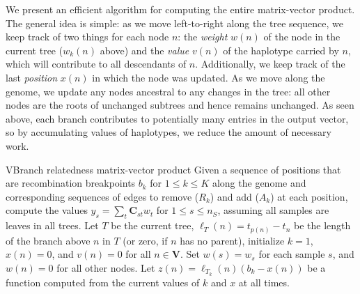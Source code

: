 We present an efficient algorithm for computing the entire matrix-vector product.
The general idea is simple: as we move left-to-right along the tree sequence,
we keep track of two things for each node $n$:
the \textit{weight} $w(n)$ of the node in the current tree ($w_k(n)$ above) and
the \textit{value} $v(n)$ of the haplotype carried by $n$,
which will contribute to all descendants of $n$.
Additionally, we keep track of the last \textit{position} $x(n)$ in which the node was updated.
As we move along the genome, we update any nodes ancestral to any changes in the tree:
all other nodes are the roots of unchanged subtrees and hence remains unchanged.
As seen above, each branch contributes to potentially many entries in the output vector,
so by accumulating values of haplotypes, we reduce the amount of necessary work.


\begin{taocpalg}{V}{Branch relatedness matrix-vector product}
{
    Given a sequence of positions that are recombination breakpoints $b_k$ for $1 \le k \le K$ 
    along the genome and corresponding sequences of edges to 
    remove ($R_k$) and add ($A_k$) at each position, 
    compute the values 
    $y_s=\sum_t\mathbf{C}_{st} w_t$ for $1 \le s \le n_S$, assuming all samples are leaves in all trees.
    Let $T$ be the current tree,
    $\ell_T(n) = t_{p(n)} - t_n$ be the length of the branch above $n$ in $T$ (or zero, if $n$ has no parent),
    initialize $k = 1$, $x(n) = 0$, and $v(n) = 0$ for all $n \in \mathbf{V}$.
    Set $w(s) = w_s$ for each sample $s$, and $w(n)=0$ for all other nodes.
    Let $z(n) = \ell_{T_k}(n) (b_k - x(n))$ be a function 
    computed from the current values of $k$ and $x$ at all times.
}




\end{taocpalg}

